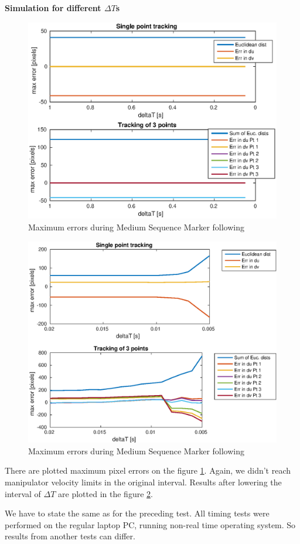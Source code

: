 \documentclass[]{scrartcl}
\begin{document}
\vspace{0.5cm}
\textbf{Simulation for different $\Delta T$s} \\
\begin{figure}
	\centering
	\includegraphics[width=0.7\linewidth]{fig/MediumSequence_errors.eps}
	\caption{Maximum errors during Medium Sequence Marker following}
	\label{fig:MediumSequence_errors}
\end{figure}
\begin{figure}
	\centering
	\includegraphics[width=0.7\linewidth]{fig/MediumSequence_low_dTs_errors.eps}
	\caption{Maximum errors during Medium Sequence Marker following}
	\label{fig:MediumSequence_low_dTs_errors}
\end{figure}
There are plotted maximum pixel errors on the figure \ref{fig:MediumSequence_errors}. Again, we didn't reach manipulator velocity limits in the original interval. Results after lowering the interval of $\Delta T$ are plotted in the figure \ref{fig:MediumSequence_low_dTs_errors}.

We have to state the same as for the preceding test. All timing tests were performed on the regular laptop PC, running non-real time operating system. So results from another tests can differ.
\end{document}
